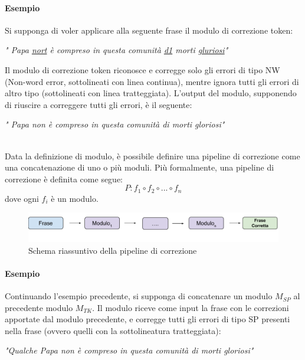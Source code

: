 \paragraph{Esempio} Si supponga di voler applicare alla seguente frase il modulo di correzione token:
\begin{center}
\textit{" Papa \ul{nort} è compreso in questa comunità \ul{d1} morti \ul{gluriosi}"}
\end{center}
Il modulo di correzione token riconosce e corregge solo gli errori di tipo NW (Non-word error, sottolineati con linea continua), mentre ignora tutti gli errori di altro tipo (sottolineati con linea tratteggiata). L'output del modulo, supponendo di riuscire a correggere tutti gli errori, è il seguente:
\begin{center}
\textit{" Papa non è compreso in questa comunità di morti gloriosi"}
\end{center}
\ \\
Data la definizione di modulo, è possibile definire una pipeline di correzione come una concatenazione di uno o più moduli. Più formalmente, una pipeline di correzione è definita come segue:
\begin{equation}
P: f_1 \circ f_2 \circ ... \circ f_n
\end{equation}
dove ogni $f_i$ è un modulo.
\begin{figure}[H]
\centering
\includegraphics[width=\textwidth]{immagini/metodologia/generale}
\caption{Schema riassuntivo della pipeline di correzione}
\label{fig:met_generale}
\end{figure}

\paragraph{Esempio} Continuando l'esempio precedente, si supponga di concatenare un modulo $M_{SP}$ al precedente modulo $M_{TK}$. Il modulo riceve come input la frase con le correzioni apportate dal modulo precedente, e corregge tutti gli errori di tipo SP presenti nella frase (ovvero quelli con la sottolineatura tratteggiata):
\begin{center}
\textit{"Qualche Papa non è compreso in questa comunità di morti gloriosi"}
\end{center}



